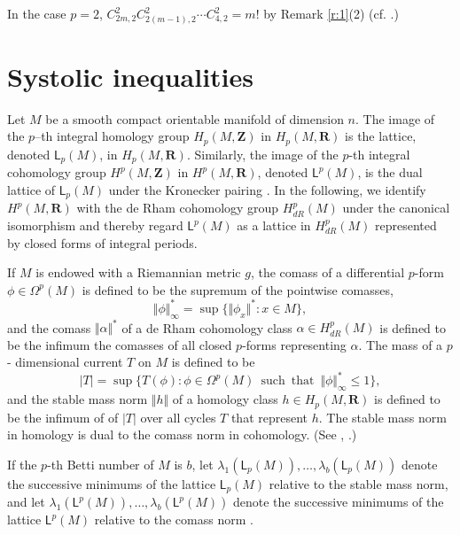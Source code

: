 \documentclass[12pt]{amsart}
\theoremstyle{definition}
\theoremstyle{remark}
\numberwithin{equation}{section}
\begin{document}
In the case $p=2$, $C_{2m,2}^2C_{2(m-1),2}^2 \cdots C_{4,2}^2=m!$ by Remark \ref{r:1}(2) (cf. \cite{GHK}.)

\section{Systolic inequalities}%

Let $M$ be a smooth  compact orientable manifold of dimension $n$. The image  of the $p$--th integral homology group $H_p(M,\mathbf{Z})$ in $H_p(M,\mathbf{R})$  is the lattice, denoted $\mathsf{L}_p(M)$, in $H_p(M,\mathbf{R})$.  Similarly, the image of the $p$-th integral cohomology group
$H^p(M,\mathbf{Z})$ in $H^p(M,\mathbf{R})$, denoted $\mathsf{L}^p(M)$, is the dual lattice of $\mathsf{L}_p(M)$ 
under the Kronecker pairing \cite[Lemma 15.4.2]{MK}.  In the following, we identify $H^p(M,\mathbf{R})$ with the de Rham cohomology group $H_{dR}^p(M)$
under the canonical isomorphism \cite[Theorem 5.6]{FW} and thereby regard $\mathsf{L}^p(M)$ as a lattice in $H_{dR}^p(M)$ represented by closed forms of integral periods.


If $M$ is endowed with a Riemannian metric $g$, the comass of a differential $p$-form $\phi \in\Omega^p(M)$ is defined to be the supremum of the pointwise comasses, 
\begin{equation*}
\Vert \phi \Vert^\ast_\infty = \sup \{ \Vert \phi_x\Vert^\ast : x \in M\},
\end{equation*}
and the comass $\Vert \alpha\Vert^\ast$ of a de Rham cohomology class $\alpha \in H^p_{dR}(M)$ is defined to be the infimum the comasses of all closed $p$-forms representing $\alpha$.  The mass of a $p$- dimensional current $T$ on $M$ is defined to be
\begin{equation*}
\vert T\vert  = \sup \{ T(\phi) : \phi \in \Omega^p(M) \enspace\mathrm{such\enspace  that}\enspace \Vert\phi\Vert_\infty^\ast \leq 1\},
\end{equation*}
and the stable mass norm $\Vert h\Vert$ of a homology class $h \in H_p(M,\mathbf{R})$ is defined to be the infimum of of $|T|$ over all cycles  $T$ that represent $h$.
The stable mass norm in homology is dual to the comass norm in cohomology. (See \cite[4.35]{MG}, \cite[4.10]{HF2}.)

If the $p$-th Betti number of $M$ is $b$,  let $\lambda_1(\mathsf{L}_p(M)),\dots, \lambda_b(\mathsf{L}_p(M))$ denote the successive minimums of the lattice $\mathsf{L}_p(M)$ relative to the stable mass norm, and let $\lambda_1(\mathsf{L}^p(M)),\dots, \lambda_b(\mathsf{L}^p(M))$ denote the successive minimums of the lattice $\mathsf{L}^p(M)$ relative to the comass norm \cite{JC}.
\end{document}
